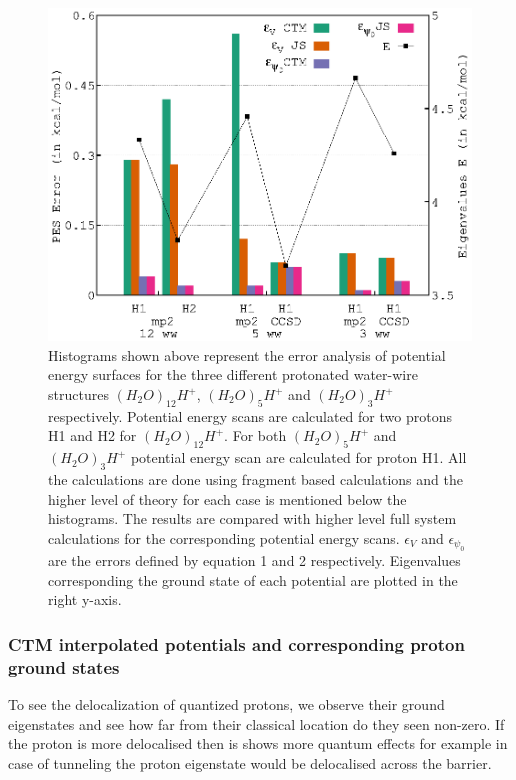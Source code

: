 \begin{figure}[H]
  \begin{center}
    \includegraphics[width=1\textwidth]{figures/wwbars.eps}
    \caption{\label{chap3fig7} Histograms shown above represent the error analysis of potential energy surfaces
    for the three different protonated water-wire structures $(H_{2}O)_{12}H^+$, $(H_{2}O)_5H^+$ and $(H_{2}O)_3H^+$
    respectively. Potential energy scans are calculated for two protons H1 and H2 for $(H_{2}O)_{12}H^+$. For
    both $(H_{2}O)_5H^+$ and $(H_{2}O)_3H^+$ potential energy scan are calculated for proton H1. All the
    calculations are done using fragment based calculations and the higher level of theory for each case is
    mentioned below the histograms. The results are compared with higher level full system calculations for the
    corresponding potential energy scans. $\epsilon_{V}$ and $\epsilon_{\psi_{0}}$ are the errors defined by
    equation 1 and 2 respectively. Eigenvalues corresponding the ground state of each potential are plotted
    in the right y-axis.}
  \end{center}
\end{figure}

\subsubsection{CTM interpolated potentials and corresponding proton ground states}
To see the delocalization of quantized protons, we observe their ground eigenstates and see how far from
their classical location do they seen non-zero. If the proton is more delocalised then is shows more
quantum effects for example in case of tunneling the proton eigenstate would be delocalised across the barrier.

